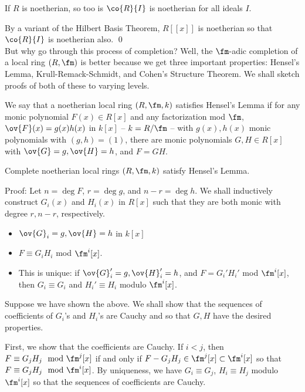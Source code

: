 \begin{cor}
If $R$ is noetherian, so too is $\co{R}{I}$ is noetherian for all ideals $I$.
\end{cor}

By a variant of the Hilbert Basis Theorem, $R[[x]]$ is noetherian so that $\co{R}{I}$ is noetherian also. \qed \\

But why go through this process of completion? Well, the $\fm$-adic completion of a local ring $(R,\fm)$ is better because we get three important properties: Hensel's Lemma, Krull-Remack-Schmidt, and Cohen's Structure Theorem. We shall sketch proofs of both of these to varying levels. 

\begin{dfn}
We say that a noetherian local ring $(R,\fm,k)$ satisfies Hensel's Lemma if for any monic polynomial $F(x) \in R[x]$ and any factorization mod $\fm$, $\ov{F}(x)=g(x)h(x)$ in $k[x]$ -- $k=R/\fm$ -- with $g(x),h(x)$ monic polynomials with $(g,h)=(1)$, there are monic polynomials $G,H \in R[x]$ with $\ov{G}=g,\ov{H}=h$, and $F=GH$. 
\end{dfn}

\begin{thmm}
Complete noetherian local rings $(R,\fm,k)$ satisfy Hensel's Lemma. 
\end{thmm}

\noindent Proof: Let $n=\deg F$, $r=\deg g$, and $n-r=\deg h$. We shall inductively construct $G_i(x)$ and $H_i(x)$ in $R[x]$ such that they are both monic with degree $r,n-r$, respectively. 
\begin{itemize}
\item $\ov{G}_i=g, \ov{H}=h$ in $k[x]$
\item $F \equiv G_iH_i$ mod $\fm^i[x]$.
\item This is unique: if $\ov{G}'_i=g,\ov{H}_i'=h$, and $F=G_i'H_i'$ mod $\fm^i[x]$, then $G_i \equiv G_i$ and $H_i' \equiv H_i$ modulo $\fm^i[x]$. 
\end{itemize}

Suppose we have shown the above. We shall show that the sequences of coefficients of $G_i$'s and $H_i$'s are Cauchy and so that $G,H$ have the desired properties. 

First, we show that the coefficients are Cauchy. If $i<j$, then $F \equiv G_jH_j \mod \fm^j [x]$ if and only if $F-G_jH_j \in \fm^j[x] \subset \fm^i[x]$ so that $F \equiv G_jH_j \mod \fm^i[x]$. By uniqueness, we have $G_i \equiv G_j$, $H_i \equiv H_j$ modulo $\fm^i[x]$ so that the sequences of coefficients are Cauchy. 

